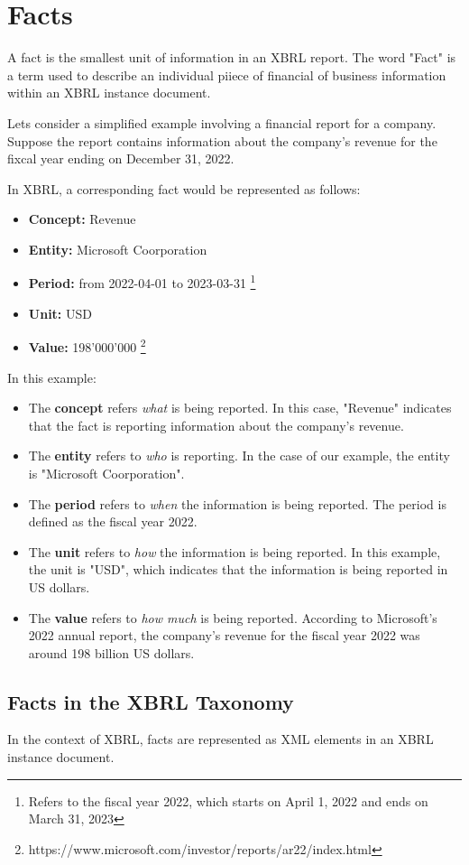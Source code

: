 \section{Facts}

A fact is the smallest unit of information in an XBRL report. 
The word "Fact" is a term used to describe an individual piiece of financial of business information within an XBRL instance document. 

Lets consider a simplified example involving a financial report for a company. 
Suppose the report contains information about the company's revenue for the fixcal year ending on December 31, 2022.

In XBRL, a corresponding fact would be represented as follows:

\begin{itemize}
    \item \textbf{Concept:} Revenue
    \item \textbf{Entity:} Microsoft Coorporation
    \item \textbf{Period:} from 2022-04-01 to 2023-03-31 \footnote[0]{Refers to the fiscal year 2022, which starts on April 1, 2022 and ends on March 31, 2023}
    \item \textbf{Unit:} USD
    \item \textbf{Value:} 198'000'000 \footnote[1]{https://www.microsoft.com/investor/reports/ar22/index.html}
\end{itemize}

In this example:

\begin{itemize}
    \item The \textbf{concept} refers \textit{what} is being reported. 
    In this case, "Revenue" indicates that the fact is reporting information about the company's revenue.
    \item The \textbf{entity} refers to \textit{who} is reporting. 
    In the case of our example, the entity is "Microsoft Coorporation".
    \item The \textbf{period} refers to \textit{when} the information is being reported.
    The period is defined as the fiscal year 2022.
    \item The \textbf{unit} refers to \textit{how} the information is being reported.
    In this example, the unit is "USD", which indicates that the information is being reported in US dollars.
    \item The \textbf{value} refers to \textit{how much} is being reported.
    According to Microsoft's 2022 annual report, the company's revenue for the fiscal year 2022 was around 198 billion US dollars.
\end{itemize}

\subsection{Facts in the XBRL Taxonomy}

In the context of XBRL, facts are represented as XML elements in an XBRL instance document. 